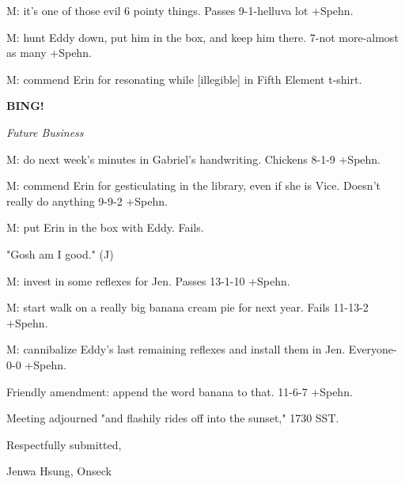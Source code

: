 \documentclass[12pt]{article}
\newcommand{\bing}{{\bf BING!} }
\newcommand{\goto}[1]{\bing \vskip 12pt \centerline{{\em{#1}}}}
\begin{document}
M: it's one of those evil 6 pointy things. Passes 9-1-helluva lot +Spehn.

M: hunt Eddy down, put him in the box, and keep him there. 7-not more-almost as many +Spehn.

M: commend Erin for resonating while [illegible] in Fifth Element t-shirt.

\goto{Future Business}

M: do next week's minutes in Gabriel's handwriting. Chickens 8-1-9 +Spehn.

M: commend Erin for gesticulating in the library, even if she is Vice. Doesn't really do anything 9-9-2 +Spehn.

M: put Erin in the box with Eddy. Fails.

"Gosh am I good." (J)

M: invest in some reflexes for Jen. Passes 13-1-10 +Spehn.

M: start walk on a really big banana cream pie for next year. Fails 11-13-2 +Spehn.

M: cannibalize Eddy's last remaining reflexes and install them in Jen. Everyone-0-0 +Spehn.

Friendly amendment: append the word banana to that. 11-6-7 +Spehn.

\vspace{12pt}

\noindent
Meeting adjourned "and flashily rides off into the sunset," 1730 SST.

\vspace{18pt}

\centerline{Respectfully submitted,}
\centerline{Jenwa Hsung, Onseck}
\end{document}
